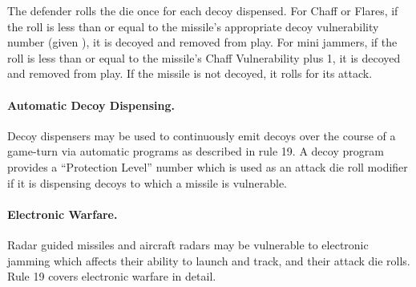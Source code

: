 The defender rolls the die once for each decoy dispensed. For Chaff or Flares, if the roll is less than or equal to the missile's appropriate decoy vulnerability number (given ), it is decoyed and removed from play. For mini jammers, if the roll is less than or equal to the missile's Chaff Vulnerability plus 1, it is decoyed and removed from play. If the missile is not decoyed, it rolls for its attack.

\paragraph{Automatic Decoy Dispensing.} Decoy dispensers may be used to continuously emit decoys over the course of a game-turn via automatic programs as described in rule 19. A decoy program provides a “Protection Level” number which is used as an attack die roll modifier if it is dispensing decoys to which a missile is vulnerable.

\paragraph{Electronic Warfare.} Radar guided missiles and aircraft radars may be vulnerable to electronic jamming which affects their ability to launch and track, and their attack die rolls. Rule 19 covers electronic warfare in detail.

